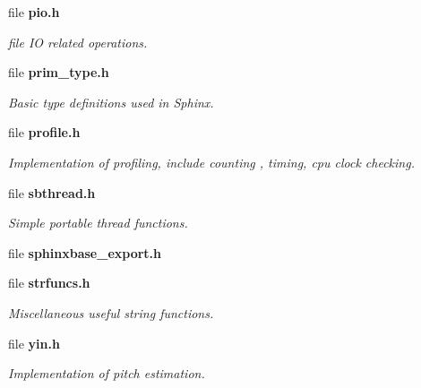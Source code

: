 \begin{DoxyCompactItemize}
file {\bf pio.\-h}
\begin{DoxyCompactList}\small\item\em file I\-O related operations. \end{DoxyCompactList}\item 
file {\bf prim\-\_\-type.\-h}
\begin{DoxyCompactList}\small\item\em Basic type definitions used in Sphinx. \end{DoxyCompactList}\item 
file {\bf profile.\-h}
\begin{DoxyCompactList}\small\item\em Implementation of profiling, include counting , timing, cpu clock checking. \end{DoxyCompactList}\item 
file {\bf sbthread.\-h}
\begin{DoxyCompactList}\small\item\em Simple portable thread functions. \end{DoxyCompactList}\item 
file {\bfseries sphinxbase\-\_\-export.\-h}
\item 
file {\bf strfuncs.\-h}
\begin{DoxyCompactList}\small\item\em Miscellaneous useful string functions. \end{DoxyCompactList}\item 
file {\bf yin.\-h}
\begin{DoxyCompactList}\small\item\em Implementation of pitch estimation. \end{DoxyCompactList}\end{DoxyCompactItemize}
